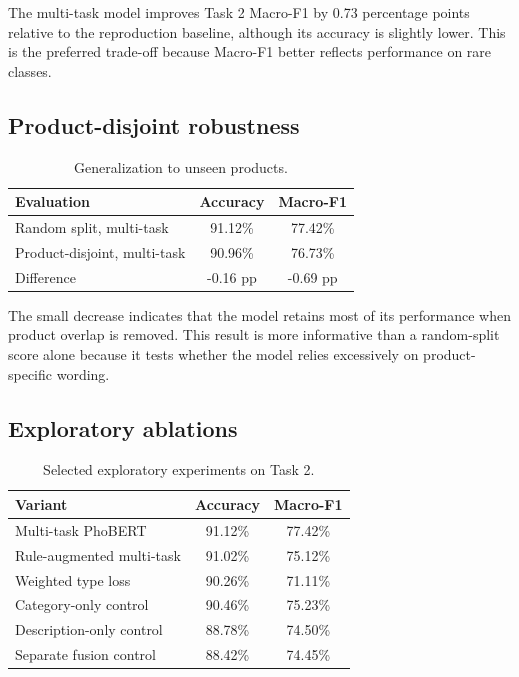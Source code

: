 \documentclass[runningheads]{llncs}
\begin{document}
The multi-task model improves Task 2 Macro-F1 by 0.73 percentage points relative to the reproduction baseline, although its accuracy is slightly lower. This is the preferred trade-off because Macro-F1 better reflects performance on rare classes.

\subsection{Product-disjoint robustness}
\begin{table}[t]
\caption{Generalization to unseen products.}
\label{tab:product}
\centering
\small
\begin{tabularx}{0.95\linewidth}{Xcc}
\toprule
Evaluation & Accuracy & Macro-F1 \\
\midrule
Random split, multi-task & 91.12\% & 77.42\% \\
Product-disjoint, multi-task & 90.96\% & 76.73\% \\
Difference & -0.16 pp & -0.69 pp \\
\bottomrule
\end{tabularx}
\end{table}

The small decrease indicates that the model retains most of its performance when product overlap is removed. This result is more informative than a random-split score alone because it tests whether the model relies excessively on product-specific wording.

\subsection{Exploratory ablations}
\begin{table}[t]
\caption{Selected exploratory experiments on Task 2.}
\label{tab:ablations}
\centering
\small
\begin{tabularx}{0.95\linewidth}{Xcc}
\toprule
Variant & Accuracy & Macro-F1 \\
\midrule
Multi-task PhoBERT & 91.12\% & 77.42\% \\
Rule-augmented multi-task & 91.02\% & 75.12\% \\
Weighted type loss & 90.26\% & 71.11\% \\
Category-only control & 90.46\% & 75.23\% \\
Description-only control & 88.78\% & 74.50\% \\
Separate fusion control & 88.42\% & 74.45\% \\
\bottomrule
\end{tabularx}
\end{table}
\end{document}
